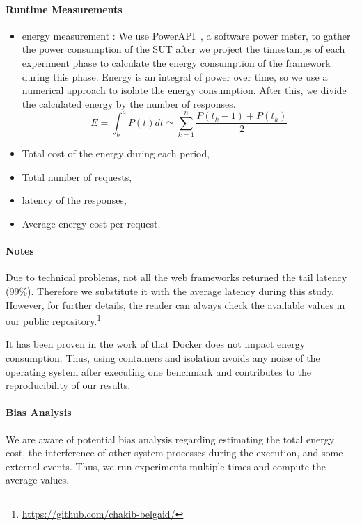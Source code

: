 \paragraph{Runtime Measurements}
\begin{itemize}
    \item energy measurement :
          We use PowerAPI~\cite{bourdon:hal-00772454}, a software power meter, to gather the power consumption of the SUT after we project the timestamps of each experiment phase to calculate the energy consumption of the framework during this phase.
          Energy is an integral of power over time, so we use a numerical approach to isolate the energy consumption.%
          After this, we divide the calculated energy by the number of responses.
          \begin{equation}
              E = \int^a_b P(t)dt \simeq \sum^n_{k=1} \frac{P(t_k-1)+P(t_k)}{2}
          \end{equation}
    \item Total cost of the energy during each period,
    \item Total number of requests,
    \item latency of the responses,
    \item Average energy cost per request.
\end{itemize}
\paragraph{Notes}
Due to technical problems, not all the web frameworks returned the tail latency (99\%). Therefore we substitute it with the average latency during this study.
However, for further details, the reader can always check the available values in our public repository.\footnote{\url{https://github.com/chakib-belgaid/}}


It has been proven in the work of \citeauthor{eddie_antonio_santos_how} that Docker does not impact energy consumption.
Thus, using containers and isolation avoids any noise of the operating system after executing one benchmark and contributes to the reproducibility of our results.

\paragraph{Bias Analysis}
We are aware of potential bias analysis regarding estimating the total energy cost, the interference of other system processes during the execution, and some external events.
Thus, we run experiments multiple times and compute the average values.

